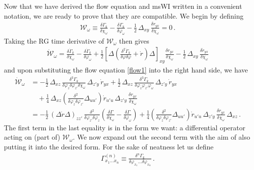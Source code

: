 \documentclass[11pt]{book}
\numberwithin{equation}{chapter}
\begin{document}
Now that we have derived the flow equation and msWI written in a convenient notation,
we are ready to prove that they are compatible. We begin by defining
\begin{align}
	\mathcal{W}_\omega\equiv\frac{\delta \Gamma_k}{\delta\chi_\omega}-\frac{\delta \Gamma_k}{\delta\varphi_\omega}
	- \frac{1}{2} \, \Delta_{xy} \, \frac{\delta r_{yx}}{\delta\chi_\omega} =0 \,.
\label{cal-W}
\end{align}
Taking the RG time derivative of $\mathcal{W_\omega}$ then gives
\begin{align}
	\mathcal{\dot W}_\omega= \frac{\delta \dot\Gamma_k}{\delta\chi_\omega}
	-\frac{\delta \dot\Gamma_k}{\delta\varphi_\omega}+
	\frac{1}{2}\left[\Delta\left(\frac{\delta^{2}\dot{\Gamma}_k}{\delta\varphi \delta\varphi}
	+\dot r\right)\Delta\right]_{\!xy}\frac{\delta r_{yx}}{\delta\chi_\omega}
	-\frac{1}{2} \, \Delta_{xy} \, \frac{\delta \dot r_{yx}}{\delta\chi_\omega}
	\label{WIdot}
\end{align}
and upon substituting the flow equation \eqref{flow1} into the right hand side, we have
\begin{align}
  \label{WIdot-2}
	\mathcal{\dot W}_{\omega} &= -\frac{1}{2} \, \Delta_{xz} \,
	\frac{\delta^{3}\Gamma_k}{\delta\varphi_{z}\delta\varphi_{z'}\delta\chi_{\omega}}
  \, \Delta_{z'y} \, \dot r_{yx}
	 + \frac{1}{2} \, \Delta_{xz} \, \frac{\delta^{3}\Gamma_k}{\delta\varphi_{z} \varphi_{z'}\varphi_\omega} \,
   \Delta_{z'y} \, \dot{r}_{yx}
	 \nonumber\\ &\quad
	 + \frac{1}{4} \, \Delta_{xz}
   \left(
     \frac{\delta^{2}}{\delta\varphi_{z}\delta\varphi_{z'}}\Delta_{uu'}
   \right)
	 \dot r_{u'u} \, \Delta_{z'y} \, \frac{\delta r_{yx}}{\delta\chi_{\omega}} \nonumber \\
	&= -\frac{1}{2} \, (\Delta \dot{r} \Delta)_{zz'} \, \frac{\delta^{2}}{\delta\varphi_{z'}\delta\varphi_{z}}
	 \left(\frac{\delta\Gamma}{\delta\chi_\omega}-\frac{\delta\Gamma}{\delta\varphi_\omega}\right)
	  +\frac{1}{4}\left(\frac{\delta^{2}}{\delta\varphi_{z}\delta\varphi_{z'}}\Delta_{uu'}\right)
	 \dot r_{u'u} \, \Delta_{z'y} \, \frac{\delta r_{yx}}{\delta\chi_{\omega}} \, \Delta_{xz} \,.
\end{align}
The first term in the last equality is in the form we want: a differential operator acting on (part of)
$\mathcal{W_\omega}$. We now expand out the second term with the aim of also putting it into the desired form.
For the sake of neatness let us define
\begin{align}
  \Gamma_{x_1...x_n}^{(n)} \equiv \frac{\delta^n\Gamma_k}{\delta\varphi_{x_1}...\delta\varphi_{x_n}} \,.
\end{align}
\end{document}
